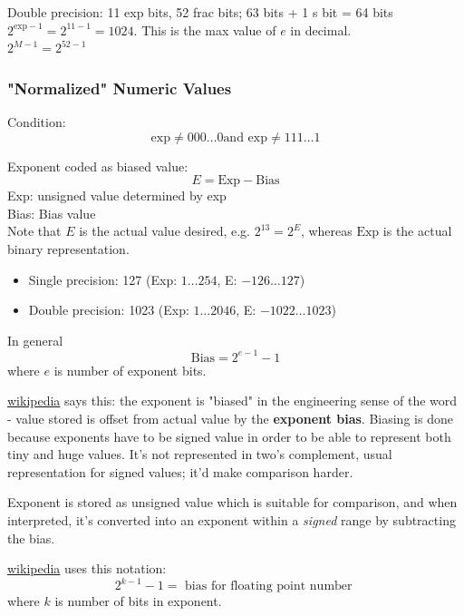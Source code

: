 \documentclass[10pt]{amsart}
\begin{document}
\begin{multicols*}{2}
Double precision: 11 exp bits, 52 frac bits; 63 bits + 1 s bit = 64 bits \\
$2^{\text{exp} - 1} = 2^{11 - 1} = 1024$. This is the max value of $e$ in decimal. \\
$2^{M-1} = 2^{52- 1}$

\subsubsection{"Normalized" Numeric Values}

Condition: \\
\[
\text{exp} \neq 000\dots 0 \text{and } \text{exp} \neq 111 \dots 1
\]

Exponent coded as biased value: \\
\begin{equation}\label{Eqn:ExponentCodingForNonZeroExp}
E = \text{Exp} - \text{Bias} 
\end{equation}
Exp: unsigned value determined by exp \\
Bias: Bias value \\

Note that $E$ is the actual value desired, e.g. $2^{13} = 2^{E}$, whereas $\text{Exp}$ is the actual binary representation.

\begin{itemize}
	\item Single precision: 127 (Exp: $1\dots 254$, E: $-126 \dots 127$) 
	\item Double precision: 1023 (Exp: $1\dots 2046$, E: $-1022 \dots 1023$) 
\end{itemize}
In general
\begin{equation}
\text{Bias} = 2^{e-1} - 1
\end{equation}
where $e$ is number of exponent bits.

\href{https://en.wikipedia.org/wiki/Exponent_bias}{wikipedia} says this: the exponent is "biased" in the engineering sense of the word - value stored is offset from actual value by the \textbf{exponent bias}. Biasing is done because exponents have to be signed value in order to be able to represent both tiny and huge values. It's not represented in two's complement, usual representation for signed values; it'd make comparison harder.

Exponent is stored as unsigned value which is suitable for comparison, and when interpreted, it's converted into an exponent within a \emph{signed} range by subtracting the bias.

\href{https://en.wikipedia.org/wiki/Exponent_bias}{wikipedia} uses this notation:
\[
2^{k-1} - 1 = \text{ bias for floating point number }
\]
where $k$ is number of bits in exponent.


\end{multicols*}
\end{document}
